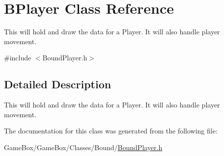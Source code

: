\hypertarget{class_b_player}{\section{\-B\-Player \-Class \-Reference}
\label{class_b_player}
}


\-This will hold and draw the data for a \-Player. \-It will also handle player movement.  




{\ttfamily \#include $<$\-Bound\-Player.\-h$>$}



\subsection{\-Detailed \-Description}
\-This will hold and draw the data for a \-Player. \-It will also handle player movement. 

\-The documentation for this class was generated from the following file\-:\begin{DoxyCompactItemize}
\item 
\-Game\-Box/\-Game\-Box/\-Classes/\-Bound/\hyperlink{_bound_player_8h}{\-Bound\-Player.\-h}\end{DoxyCompactItemize}
